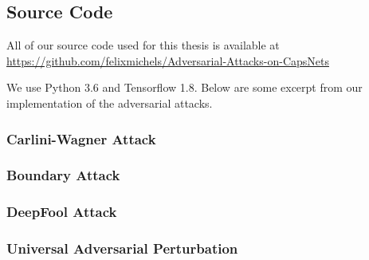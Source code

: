 

\subsection{Source Code}

All of our source code used for this thesis is available at \url{https://github.com/felixmichels/Adversarial-Attacks-on-CapsNets}

We use Python 3.6 and Tensorflow 1.8.
Below are some excerpt from our implementation of the adversarial attacks.

\subsubsection{Carlini-Wagner Attack}


\subsubsection{Boundary Attack}


\subsubsection{DeepFool Attack}


\subsubsection{Universal Adversarial Perturbation}

